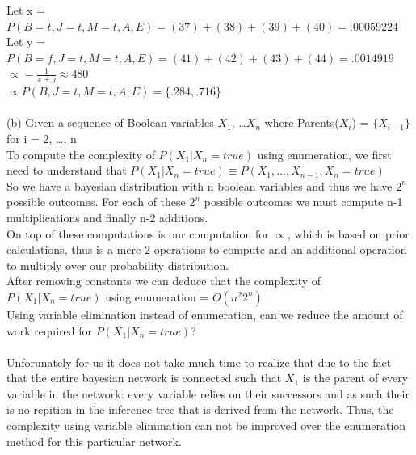 \documentclass[12pt]{article}
\begin{document}
Let x = $P(B=t, J = t, M = t, A, E) = (37) + (38) + (39) + (40) = .00059224 $\\
Let y = $P(B=f, J = t, M = t, A, E) = (41) + (42) + (43) + (44) = .0014919$\\
$\propto = \frac{1}{x+y} \approx 480$\\
$\propto P(B, J = t, M = t, A, E) = \{.284, .716\}$ \\ \\
(b) Given a sequence of Boolean variables $X_1$, \dots $X_n$ where Parents($X_i$) = $\{X_{i-1}\}$ for i = 2, \dots, n \\
To compute the complexity of $P(X_1|X_n = true)$ using enumeration, we first need to understand that $P(X_1|X_n = true) \equiv P(X_1, \dots, X_{n-1}, X_n = true)$ \\
So we have a bayesian distribution with n boolean variables and thus we have $2^n$ possible outcomes. For each of these $2^n$ possible outcomes we must compute n-1 multiplications and finally n-2 additions. \\
On top of these computations is our computation for $\propto$, which is based on prior calculations, thus is a mere 2 operations to compute and an additional operation to multiply over our probability distribution. \\
After removing constants we can deduce that the complexity of $P(X_1|X_n = true)$ using enumeration = $O(n^2 2^n)$ \\
Using variable elimination instead of enumeration, can we reduce the amount of work required for $P(X_1|X_n = true)$? \\ \\
Unforunately for us it does not take much time to realize that due to the fact that the entire bayesian network is connected such that $X_1$ is the parent of every variable in the network: every variable relies on their successors and as such their is no repition in the inference tree that is derived from the network. Thus, the complexity using variable elimination can not be improved over the enumeration method for this particular network.



\newpage
\end{document}
